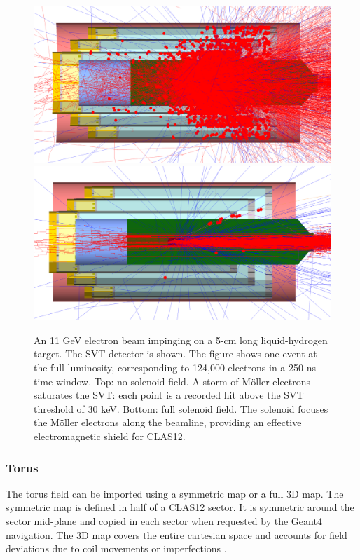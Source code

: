 \begin{figure}
	\centering
	\includegraphics[width=0.98\columnwidth,keepaspectratio]{img/solenoidOFF.png}
	\includegraphics[width=0.98\columnwidth,keepaspectratio]{img/solenoidON.png}
    \caption{An 11 GeV electron beam impinging on a 5-cm long liquid-hydrogen target. The SVT detector is shown.
             The figure shows one event at the full \cLuminosity luminosity, corresponding to 124,000 electrons in a 250 ns time window.
			 Top: no solenoid field. A storm of M\"oller electrons saturates the SVT: each point is a recorded hit above the SVT threshold of 30 keV.
			 Bottom: full solenoid field.
             The solenoid focuses the M\"oller electrons along the beamline, providing an effective electromagnetic shield for CLAS12. }
	\label{fig:solenoidONOFF}
\end{figure}

\subsubsection{Torus}
The torus field can be imported using a symmetric map or a full 3D map.
The symmetric map is defined in half of a CLAS12 sector. It is symmetric around the sector mid-plane and copied in each sector
when requested by the Geant4 navigation. The 3D map covers the entire cartesian space and accounts for field deviations due to coil
movements or imperfections \cite{GhoshalSolenoid}.

